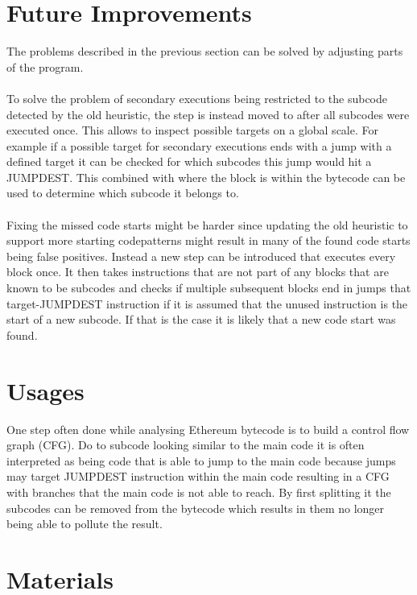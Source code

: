 \documentclass{article}
\begin{document}
\section{Future Improvements}
    The problems described in the previous section can be solved by adjusting parts of the program. 
\paragraph{}    
    To solve the problem of secondary executions being restricted to the subcode detected by the old heuristic, the step is instead moved to after all subcodes were executed once. This allows to inspect possible targets on a global scale. For example if a possible target for secondary executions ends with a jump with a defined target it can be checked for which subcodes this jump would hit a JUMPDEST. This combined with where the block is within the bytecode can be used to determine which subcode it belongs to.
\paragraph{}
    Fixing the missed code starts might be harder since updating the old heuristic to support more starting codepatterns might result in many of the found code starts being false positives. Instead a new step can be introduced that executes every block once. It then takes instructions that are not part of any blocks that are known to be subcodes and checks if multiple subsequent blocks end in jumps that target-JUMPDEST instruction if it is assumed that the unused instruction is the start of a new subcode. If that is the case it is likely that a new code start was found.
\section{Usages}

    One step often done while analysing Ethereum bytecode is to build a control flow graph (CFG)\cite{brent}\cite{krupp}\cite{zhou}. Do to subcode looking similar to the main code it is often interpreted as being code that is able to jump to the main code because jumps may target JUMPDEST instruction within the main code resulting in a CFG with branches that the main code is not able to reach. By first splitting it the subcodes can be removed from the bytecode which results in them no longer being able to pollute the result.
\section{Materials}
\end{document}
